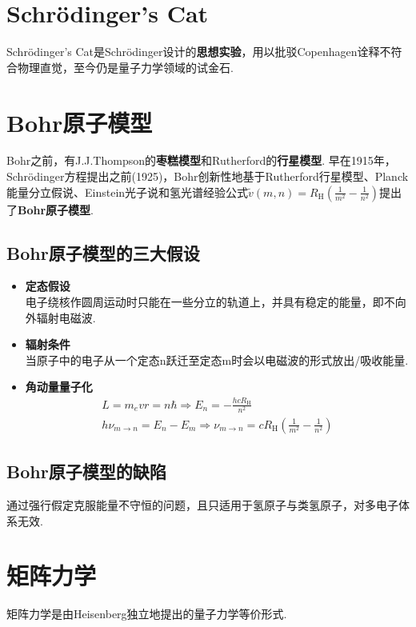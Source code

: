 \section{Schrödinger's Cat}
Schrödinger's Cat是Schrödinger设计的\textbf{思想实验}，用以批驳Copenhagen诠释不符合物理直觉，至今仍是量子力学领域的试金石.

\section{Bohr原子模型}
Bohr之前，有J.J.Thompson的\textbf{枣糕模型}和Rutherford的\textbf{行星模型}.
早在1915年，Schrödinger方程提出之前(1925)，Bohr创新性地基于Rutherford行星模型、Planck能量分立假说、Einstein光子说和氢光谱经验公式$\tilde{v}(m,n) = R_{\mathrm H}\left(\frac{1}{m^2}-\frac{1}{n^2}\right)$提出了\textbf{Bohr原子模型}.

\subsection{Bohr原子模型的三大假设}
\begin{itemize}
    \item \textbf{定态假设}\\
    电子绕核作圆周运动时只能在一些分立的轨道上，并具有稳定的能量，即不向外辐射电磁波.
    \item \textbf{辐射条件}\\
    当原子中的电子从一个定态n跃迁至定态m时会以电磁波的形式放出/吸收能量.
    \item \textbf{角动量量子化}
    \begin{gather*}
        L = m_e vr = n\hbar \Rightarrow E_n = -\frac{hcR_{\mathrm{H}}}{n^2} \\
        h\nu_{m \rightarrow n} = E_n - E_m \Rightarrow \nu_{m \rightarrow n} = cR_{\mathrm H}\left(\frac{1}{m^2}-\frac{1}{n^2}\right)
    \end{gather*}
\end{itemize}

\subsection{Bohr原子模型的缺陷}
通过强行假定克服能量不守恒的问题，且只适用于氢原子与类氢原子，对多电子体系无效.

\section{矩阵力学}
矩阵力学是由Heisenberg独立地提出的量子力学等价形式.

